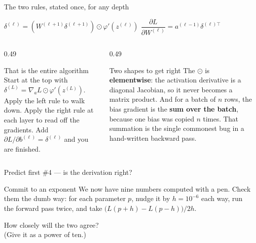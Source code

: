 \documentclass[aspectratio=169]{beamer}
\begin{document}
\begin{frame}[shrink=6]{The two rules, stated once, for any depth}
  \begin{exampleblock}{}
    \centering\large
    $\delta^{(\ell)} = \left(W^{(\ell+1)}\delta^{(\ell+1)}\right)
      \odot \varphi'\!\left(z^{(\ell)}\right)$
    \qquad\qquad
    $\dfrac{\partial L}{\partial W^{(\ell)}} = a^{(\ell-1)}\delta^{(\ell)\top}$
  \end{exampleblock}
  \begin{columns}[T]
    \begin{column}{0.49\textwidth}
      \begin{block}{That is the entire algorithm}
        Start at the top with
        $\delta^{(L)} = \nabla_{a}L \odot \varphi'(z^{(L)})$. Apply the left
        rule to walk down. Apply the right rule at each layer to read off the
        gradients. Add $\partial L/\partial b^{(\ell)} = \delta^{(\ell)}$
        and you are finished.
      \end{block}
    \end{column}
    \begin{column}{0.49\textwidth}
      \begin{alertblock}{Two shapes to get right}
        The $\odot$ is \textbf{elementwise}: the activation derivative is a
        diagonal Jacobian, so it never becomes a matrix product. And for a
        batch of $n$ rows, the bias gradient is the \textbf{sum over the
        batch}, because one bias was copied $n$ times. That summation is the
        single commonest bug in a hand-written backward pass.
      \end{alertblock}
    \end{column}
  \end{columns}
\end{frame}

\begin{frame}[shrink=8]{Predict first \#4 --- is the derivation right?}
  \begin{alertblock}{Commit to an exponent}
    We now have nine numbers computed with a pen. Check them the dumb way:
    for each parameter $p$, nudge it by $h = 10^{-6}$ each way, run the
    forward pass twice, and take
    $\big(L(p{+}h) - L(p{-}h)\big) / 2h$.

    \medskip
    \centering\large
    How closely will the two agree?\\
    \normalsize (Give it as a power of ten.)
  \end{alertblock}
\end{frame}
\end{document}
